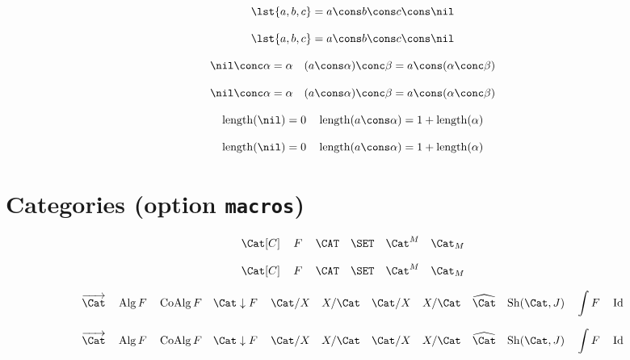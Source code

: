 \documentclass{article}
\begin{document}
\begin{verbatim*}
\[
\lst{a,b,c}=a\cons b\cons c\cons\nil
\]
\end{verbatim*}
%
\[
  \lst{ a, b, c } = a \cons b \cons c \cons \nil
\]

\begin{verbatim*}
\[
\nil\conc\alpha=\alpha\quad
(a\cons\alpha)\conc\beta=a\cons(\alpha\conc\beta)
\]
\end{verbatim*}
%
\[
  \nil             \conc \alpha = \alpha \quad
  (a \cons \alpha) \conc \beta  = a \cons (\alpha \conc \beta)
\]

\begin{verbatim*}
\[
\length(\nil)=0\quad
\length(a\cons\alpha)=1+\length(\alpha)
\]
\end{verbatim*}
%
\[
  \length(\nil)           = 0 \quad
  \length(a \cons \alpha) = 1 + \length(\alpha)
\]

\section{Categories (option \texttt{macros})}

\begin{verbatim*}
\[
\Cat[C]\quad
\Fun[F]\quad
\CAT\quad
\SET\quad
\EM[\Cat][\Fun[M]]\quad
\Kl[\Cat][\Fun[M]]
\]
\end{verbatim*}
%
\[
  \Cat[C] \quad
  \Fun[F] \quad
  \CAT \quad
  \SET \quad
  \EM[\Cat][\Fun[M]] \quad
  \Kl[\Cat][\Fun[M]]
\]

\begin{verbatim*}
\[
\Arrow[\Cat]\quad
\Alg{\Fun}\quad
\CoAlg{\Fun}\quad
\Comma[\Cat][\Fun]\quad
\Slice[\Cat][X]\quad
\Coslice[\Cat][X]\quad
\Over[\Cat][X]\quad
\Under[\Cat][X]\quad
\Psh[\Cat]\quad
\Sh[\Cat][J]\quad
\Elts[\Fun]\quad
\Id
\]
\end{verbatim*}
%
\[
  \Arrow[\Cat] \quad
  \Alg{\Fun} \quad
  \CoAlg{\Fun} \quad
  \Comma[\Cat][\Fun] \quad
  \Slice[\Cat][X] \quad
  \Coslice[\Cat][X] \quad
  \Over[\Cat][X] \quad
  \Under[\Cat][X] \quad
  \Psh[\Cat] \quad
  \Sh[\Cat][J] \quad
  \Elts[\Fun] \quad
  \Id
\]
\end{document}
